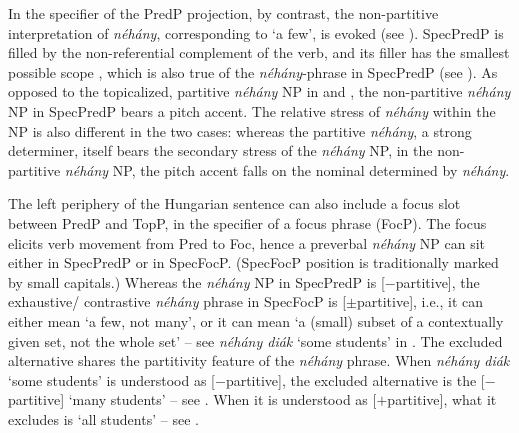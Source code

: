 \documentclass[output=paper]{langscibook}
\begin{document}
In the specifier of the PredP projection, by contrast, the non-partitive interpretation of \textit{néhány}, corresponding to `a few', is evoked (see ).  SpecPredP is filled by the non-referential complement of the verb, and its filler has the smallest possible scope \citep{szabolcsi1983specifikus}, which is also true of the \textit{néhány}-phrase in SpecPredP (see ). As opposed to the topicalized, partitive \textit{néhány} NP in  and , the non-partitive \textit{néhány} NP in SpecPredP bears a pitch accent. The relative stress of \textit{néhány} within the NP is also different in the two cases: whereas the partitive \textit{néhány}, a strong determiner, itself bears the secondary stress of the \textit{néhány} NP, in the non-partitive \textit{néhány} NP, the pitch accent falls on the nominal determined by \textit{néhány}.

\eal
{}
\ex[]{
\gll [[$_\text{DistP}$ \minsp{ʹ} Mind-három professzor	[$_\text{PredP}$ néhány \minsp{ʹ} diákkal konzultál.]]\\
{} {} all-three professor	{} some {} student.with consults\\
\glt `Each of the three professors is consulting with some students.' \label{kis-zet:mindharom professzor}
}
\zl

\noindent The left periphery of the Hungarian sentence can also include a focus slot between PredP and TopP, in the specifier of a focus phrase (FocP). The focus elicits verb movement from Pred to Foc, hence a preverbal \textit{néhány} NP can sit either in SpecPredP or in SpecFocP. (SpecFocP position is traditionally marked by small capitals.) Whereas the \textit{néhány} NP in SpecPredP is [$-$partitive], the exhaustive/ contrastive \textit{néhány} phrase in SpecFocP is [$\pm$parti\-tive], i.e., it can either mean `a few, not many', or it can mean ‘a (small) subset of a contextually given set, not the whole set’ -- see \textit{néhány diák} `some students' in . The excluded alternative shares the partitivity feature of the \textit{néhány} phrase. When \textit{néhány diák} `some students' is understood as [$-$partitive], the excluded alternative is the [$-$partitive] `many students' – see . When it is understood as [$+$partitive], what it excludes is `all students' -- see . 
\end{document}
